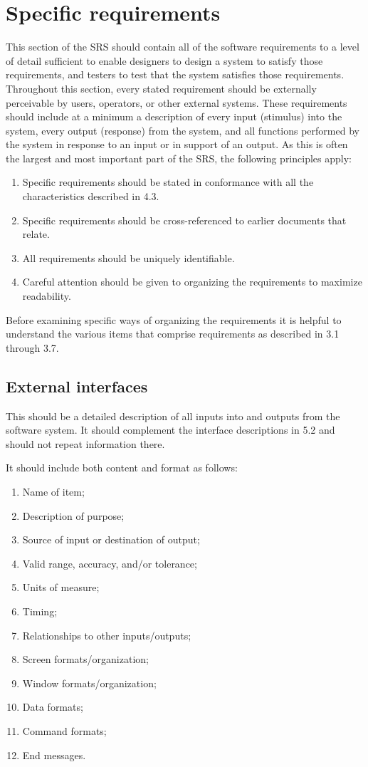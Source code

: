 \documentclass{scrreprt}
\begin{document}
\chapter{Specific requirements}
This section of the SRS should contain all of the software requirements to a
level of detail sufficient to enable designers to design a system to satisfy
those requirements, and testers to test that the system satisfies those
requirements. Throughout this section, every stated requirement should be
externally perceivable by users, operators, or other external systems. These
requirements should include at a minimum a description of every input (stimulus)
into the system, every output (response) from the system, and all functions
performed by the system in response to an input or in support of an output. As
this is often the largest and most important part of the SRS, the following
principles apply:
\begin{enumerate}
	\item Specific requirements should be stated in conformance with all the
		characteristics described in 4.3.
	\item Specific requirements should be cross-referenced to earlier documents
		that relate.
	\item All requirements should be uniquely identifiable.
	\item Careful attention should be given to organizing the requirements to
		maximize readability.
\end{enumerate}

Before examining specific ways of organizing the requirements it is helpful to
understand the various items that comprise requirements as described in 3.1
through 3.7.

\section{External interfaces}

This should be a detailed description of all inputs into and outputs from the
software system. It should complement the interface descriptions in 5.2 and
should not repeat information there.

It should include both content and format as follows:
\begin{enumerate}
	\item Name of item;
	\item Description of purpose;
	\item Source of input or destination of output;
	\item Valid range, accuracy, and/or tolerance;
	\item Units of measure;
	\item Timing;
	\item Relationships to other inputs/outputs;
	\item Screen formats/organization;
	\item Window formats/organization;
	\item Data formats;
	\item Command formats;
	\item End messages.
\end{enumerate}
\end{document}
